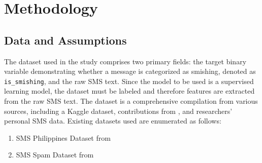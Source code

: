 \documentclass[conference]{IEEEtran}
\begin{document}
\section{Methodology}




\subsection*{Data and Assumptions}

The dataset used in the study comprises two primary fields: the target binary variable demonstrating whether a message is categorized as smishing, denoted as \texttt{is\_smishing}, and the raw SMS text. Since the model to be used is a supervised learning model, the dataset must be labeled and therefore features are extracted from the raw SMS text. The dataset is a comprehensive compilation from various sources, including a Kaggle dataset, contributions from \cite{mishra2022}, and researchers' personal SMS data. Existing datasets used are enumerated as follows:
\begin{enumerate}
    \item SMS Philippines Dataset from \cite{bwandowando2023}
    \item SMS Spam Dataset from \cite{mishra2022}
\end{enumerate}
\end{document}
